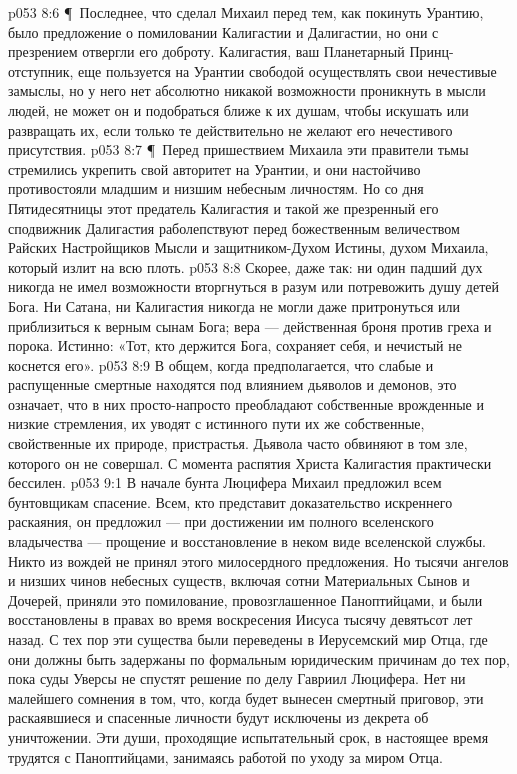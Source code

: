 \vs p053 8:6 \P\ Последнее, что сделал Михаил перед тем, как покинуть Урантию, было предложение о помиловании Калигастии и Далигастии, но они с презрением отвергли его доброту. Калигастия, ваш Планетарный Принц\hyp{}отступник, еще пользуется на Урантии свободой осуществлять свои нечестивые замыслы, но у него нет абсолютно никакой возможности проникнуть в мысли людей, не может он и подобраться ближе к их душам, чтобы искушать или развращать их, если только те действительно не желают его нечестивого присутствия.
\vs p053 8:7 \P\ Перед пришествием Михаила эти правители тьмы стремились укрепить свой авторитет на Урантии, и они настойчиво противостояли младшим и низшим небесным личностям. Но со дня Пятидесятницы этот предатель Калигастия и такой же презренный его сподвижник Далигастия раболепствуют перед божественным величеством Райских Настройщиков Мысли и защитником\hyp{}Духом Истины, духом Михаила, который излит на всю плоть.
\vs p053 8:8 Скорее, даже так: ни один падший дух никогда не имел возможности вторгнуться в разум или потревожить душу детей Бога. Ни Сатана, ни Калигастия никогда не могли даже притронуться или приблизиться к верным сынам Бога; вера --- действенная броня против греха и порока. Истинно: «Тот, кто держится Бога, сохраняет себя, и нечистый не коснется его».
\vs p053 8:9 В общем, когда предполагается, что слабые и распущенные смертные находятся под влиянием дьяволов и демонов, это означает, что в них просто\hyp{}напросто преобладают собственные врожденные и низкие стремления, их уводят с истинного пути их же собственные, свойственные их природе, пристрастья. Дьявола часто обвиняют в том зле, которого он не совершал. С момента распятия Христа Калигастия практически бессилен.
\vs p053 9:1 В начале бунта Люцифера Михаил предложил всем бунтовщикам спасение. Всем, кто представит доказательство искреннего раскаяния, он предложил --- при достижении им полного вселенского владычества --- прощение и восстановление в неком виде вселенской службы. Никто из вождей не принял этого милосердного предложения. Но тысячи ангелов и низших чинов небесных существ, включая сотни Материальных Сынов и Дочерей, приняли это помилование, провозглашенное Паноптийцами, и были восстановлены в правах во время воскресения Иисуса тысячу девятьсот лет назад. С тех пор эти существа были переведены в Иерусемский мир Отца, где они должны быть задержаны по формальным юридическим причинам до тех пор, пока суды Уверсы не спустят решение по делу Гавриил  Люцифера. Нет ни малейшего сомнения в том, что, когда будет вынесен смертный приговор, эти раскаявшиеся и спасенные личности будут исключены из декрета об уничтожении. Эти души, проходящие испытательный срок, в настоящее время трудятся с Паноптийцами, занимаясь работой по уходу за миром Отца.
